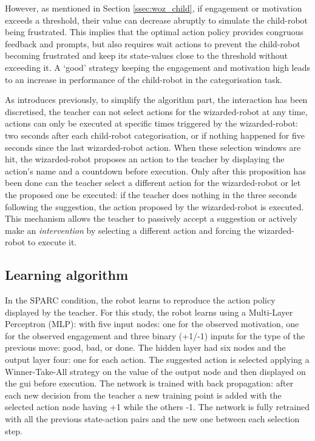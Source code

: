 However, as mentioned in Section \ref{ssec:woz_child}, if engagement or motivation exceeds a threshold, their value can decrease abruptly to simulate the child-robot being frustrated. This implies that the optimal action policy provides congruous feedback and prompts, but also requires wait actions to prevent the child-robot becoming frustrated and keep its state-values close to the threshold without exceeding it. A `good' strategy keeping the engagement and motivation high leads to an increase in performance of the child-robot in the categorisation task.

As introduces previously, to simplify the algorithm part, the interaction has been discretised, the teacher can not select actions for the wizarded-robot at any time, actions can only be executed at specific times triggered by the wizarded-robot: two seconds after each child-robot categorisation, or if nothing happened for five seconds since the last wizarded-robot action. When these selection windows are hit, the wizarded-robot proposes an action to the teacher by displaying the action's name and a countdown before execution. Only after this proposition has been done can the teacher select a different action for the wizarded-robot or let the proposed one be executed: if the teacher does nothing in the three seconds following the suggestion, the action proposed by the wizarded-robot is executed. This mechanism allows the teacher to passively accept a suggestion or actively make an \emph{intervention} by selecting a different action and forcing the wizarded-robot to execute it.

\subsection{Learning algorithm}

In the SPARC condition, the robot learns to reproduce the action policy displayed by the teacher. For this study, the robot learns using a Multi-Layer Perceptron (MLP): with five input nodes: one for the observed motivation, one for the observed engagement and three binary (+1/-1) inputs for the type of the previous move: good, bad, or done. The hidden layer had six nodes and the output layer four: one for each action. The suggested action is selected applying a Winner-Take-All strategy on the value of the output node and then displayed on the \gls{gui} before execution. The network is trained with back propagation: after each new decision from the teacher a new training point is added with the selected action node having +1 while the others -1. The network is fully retrained with all the previous state-action pairs and the new one between each selection step. 

